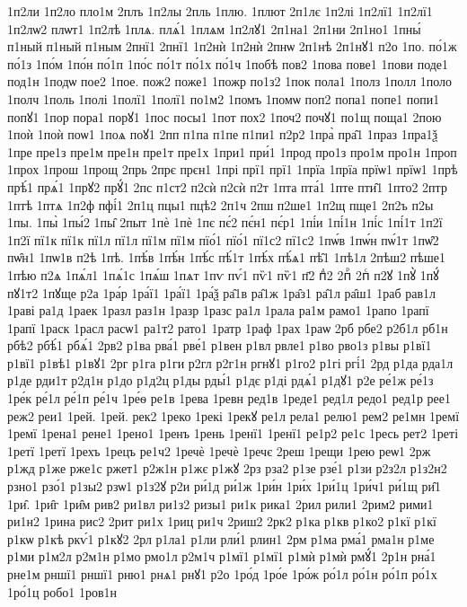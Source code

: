 {1п2ли
1п2ло
пло1м
2плъ
1п2лы
2пль
1плю.
1плют
2п1лє
1п2лі
1п2лї1
1п2лї1
1п2лѡ2
плѡт1
1п2лѣ
1плѧ.
плѧ́1
1плѧм
1п2лꙋ1
2п1на1
2п1ни
2п1но1
1пны́
п1ный
п1ный
п1ным
2пнї1
2пнї1
1п2нѝ
1п2нѝ
2пнѡ
2п1нѣ
2п1нꙋ1
п2о
1по.
по́1ж
по́1з
1по́м
1по́н
по́1п
1по́с
по́1т
по́1х
по́1ч
1побѣ
пов2
1пова
пове1
1пови
поде1
под1н
1подѡ
пое2
1пое.
пож2
поже1
1пожр
по1з2
1пок
пола1
1полз
1полл
1поло
1полч
1поль
1полі
1полї1
1полї1
по1м2
1помъ
1помѡ
поп2
попа1
попе1
попи1
попꙋ1
1пор
пора1
порꙋ1
1пос
посы1
1пот
пох2
1поч2
почꙋ1
по1щ
поща1
2пою
1поѝ
1поѝ
поѡ1
1поѧ
поꙋ1
2пп
п1па
п1пе
п1пи1
п2р2
1пра̀
пра̑1
1праз
1пра1ѯ
1пре
пре1з
пре1м
пре1н
пре1т
пре1х
1при1
при́1
1прод
про1з
про1м
про1н
1проп
1прох
1прош
1прощ
2прь
2прє
прєн1
1прі
прї1
прї1
1прїа
1прїа
прїѡ1
прїѡ1
1прѣ
прѣ́1
прѧ́1
1прꙋ2
прꙋ́1
2пс
п1ст2
п2сѝ
п2сѝ
п2т
1пта
пта́1
1пте
пти̑1
1пто2
2птр
1птѣ
1птѧ
1п2ф
пфі́1
2п1ц
пцы1
пцѣ2
2п1ч
2пш
п2ше1
1п2щ
пще1
2п2ъ
п2ы
1пы.
1пы̀
1пы́2
1пы̑
2пыт
1пѐ
1пѐ
1пє
пє́2
пє́н1
пє́р1
1пі́и
1пі́1н
1пі́с
1пі́1т
1п2ї
1п2ї
пї1к
пї1к
пї1л
пї1л
пї1м
пї1м
пїо́1
пїо́1
пї1с2
пї1с2
1пѡ́в
1пѡ́н
пѡ́1т
1пѡ̑2
пѡ̑н1
1пѡ1в
п2ѣ
1пѣ.
1пѣ́в
1пѣ́н
1пѣ́с
пѣ́1т
1пѣ́х
пѣ́ѧ1
пѣ̑1
1пѣ1л
2пѣш2
пѣше1
1пѣю
п2ѧ
1пѧ́л1
1пѧ́1с
1пѧ́ш
1пѧт
1пѵ
пѵ́1
пѷ1
пѷ1
п҃2
пⷣ2
2пⷬ
2пⷭ
п2ꙋ
1пꙋ̀
1пꙋ́
пꙋ1т2
1пꙋще
р2а
1ра́р
1ра́ї1
1ра́ї1
1ра́ѯ
ра̑1в
ра̑1ж
1ра̑з1
ра̑1л
ра̑ш1
1раб
рав1л
1раві
ра1д
1раек
1разл
раз1н
1разр
1разс
ра1л
1рала
ра1м
рамо1
1рапо
1рапї
1рапї
1раск
1расл
расѡ1
ра1т2
рато1
1ратр
1раф
1рах
1раѡ
2рб
рбе2
р2б1л
рб1н
рбѣ2
рбѣ́1
рбѧ́1
2рв2
р1ва
рва́1
рве́1
р1вен
р1вл
рвле1
р1во
рво1з
р1вы
р1вї1
р1вї1
р1вѣ1
р1вꙋ1
2рг
р1га
р1ги
р2гл
р2г1н
ргнꙋ1
р1го2
р1гі
ргі́1
2рд
р1да
рда1л
р1де
рди1т
р2д1н
р1до
р1д2ц
р1ды
рды́1
р1дє
р1ді
рдѧ́1
р1дꙋ1
р2е
ре́1ж
ре́1з
1ре́к
ре́1л
ре́1п
ре́1ч
1ре́ѳ
ре1в
1рева
1ревн
ред1в
1реде1
ред1л
редо1
ред1р
рее1
реж2
реи1
1рей.
1рей.
рек2
1реко
1рекі
1рекꙋ
ре1л
рела1
релю1
рем2
ре1мн
1ремї
1ремї
1рена1
рене1
1рено1
1ренъ
1рень
1ренї1
1ренї1
ре1р2
ре1с
1ресь
рет2
1реті
1ретї
1ретї
1рехъ
1рецъ
ре1ч2
1речѐ
1речѐ
1речє
2реш
1рещи
1рею
реѡ1
2рж
р1жд
р1же
рже1с
ржет1
р2ж1н
р1жє
р1жꙋ
2рз
рза2
р1зе
рзе́1
р1зи
р2з2л
р1з2н2
рзно1
рзо́1
р1зы2
рзѡ1
р1з2ꙋ
р2и
ри́1д
ри́1ж
1ри́н
1ри́х
1ри́1ц
1ри́ч1
ри́1щ
ри̑1
1ри̑.
1ри̑г
1ри̑м
рив2
ри1вл
ри1з2
ризы1
ри1к
рика1
2рил
рили1
2рим2
рими1
ри1н2
1рина
рис2
2рит
ри1х
1риц
ри1ч
2риш2
2рк2
р1ка
р1кв
р1ко2
р1кї
р1кї
р1кѡ
р1кѣ
ркѵ́1
р1кꙋ2
2рл
р1ла1
р1ли
рли́1
рлин1
2рм
р1ма
рма́1
рма1н
р1ме
р1ми
р1м2л
р2м1н
р1мо
рмо1л
р2м1ч
р1мї1
р1мї1
р1мѝ
р1мѝ
рмꙋ́1
2р1н
рна́1
рне1м
рншї1
рншї1
рню1
рнѧ1
рнꙋ1
р2о
1ро́д
1ро́е
1ро́ж
ро́1л
ро́1н
ро́1п
ро́1х
1ро́1ц
робо1
1ров1н
}
